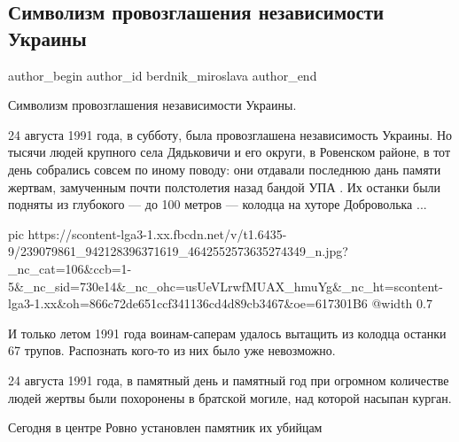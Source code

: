  
 
 
 
 
 
\subsection{Символизм провозглашения независимости Украины}
\label{sec:24_08_2021.fb.berdnik_miroslava.1.nezalezhnist_simvolizm}
 
\ifcmt
 author_begin
   author_id berdnik_miroslava
 author_end
\fi

Символизм провозглашения независимости Украины.

24 августа 1991 года, в субботу, была провозглашена независимость Украины. Но
тысячи людей крупного села Дядьковичи и его округи, в Ровенском районе, в тот
день собрались совсем по иному поводу: они отдавали последнюю дань памяти
жертвам, замученным почти полстолетия назад бандой УПА . Их останки были
подняты из глубокого — до 100 метров — колодца на хуторе Доброволька ...

\ifcmt
  pic https://scontent-lga3-1.xx.fbcdn.net/v/t1.6435-9/239079861_942128396371619_4642552573635274349_n.jpg?_nc_cat=106&ccb=1-5&_nc_sid=730e14&_nc_ohc=usUeVLrwfMUAX_hmuYg&_nc_ht=scontent-lga3-1.xx&oh=866c72de651ccf341136cd4d89cb3467&oe=617301B6
  @width 0.7
\fi

И только летом 1991 года воинам-саперам удалось  вытащить из колодца останки 67
трупов. Распознать кого-то из них было уже невозможно.

24 августа 1991 года, в памятный день и памятный год при огромном количестве
людей жертвы были похоронены в братской могиле, над которой насыпан курган.

Сегодня в центре Ровно установлен памятник их убийцам
